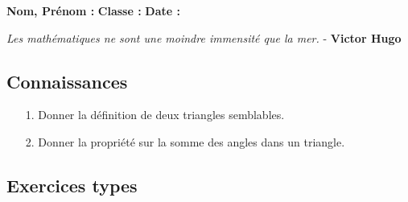 \documentclass[11pt]{article}
\begin{document}
\setlength{\columnseprule}{1pt}

\textbf{Nom, Prénom :} \hspace{8cm} \textbf{Classe :} \hspace{3cm} \textbf{Date :}\\
\vspace{-0.8cm}
\begin{center}
  \textit{Les mathématiques ne sont une moindre immensité que la mer.}  - \textbf{Victor Hugo}
\end{center}
\vspace{-0.8cm}

\subsection*{Connaissances}

\begin{enumerate}
  \item[1.] Donner la définition de deux triangles semblables.
  \item[2.] Donner la propriété sur la somme des angles dans un triangle. 
\end{enumerate}



\subsection*{Exercices types}
\end{document}

